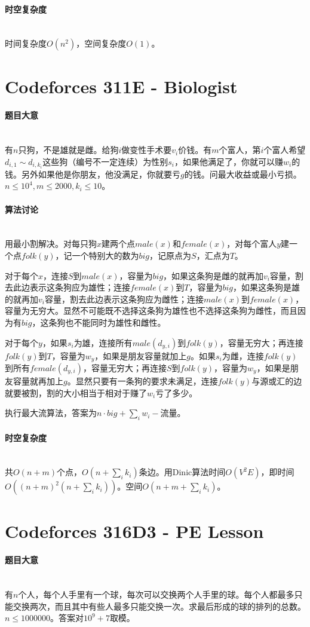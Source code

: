 \documentclass[UTF8]{ctexart}
\newcommand{\myparagraph}[1]{\paragraph{#1}\mbox{}\\}
\theoremstyle{nonumberplain}
\begin{document}
		\myparagraph{时空复杂度}
		
			时间复杂度$O(n^2)$，空间复杂度$O(1)$。
	
	\section{Codeforces 311E - Biologist}
	
		\myparagraph{题目大意}
		
			有$n$只狗，不是雄就是雌。给狗$i$做变性手术要$v_i$价钱。有$m$个富人，第$i$个富人希望$d_{i,1} \sim d_{i,k_i}$这些狗（编号不一定连续）为性别$s_i$，如果他满足了，你就可以赚$w_i$的钱。另外如果他是你朋友，他没满足，你就要亏$g$的钱。问最大收益或最小亏损。$n \leq 10^4, m \leq 2000, k_i \leq 10$。
		
		\myparagraph{算法讨论}
		
			用最小割解决。对每只狗$x$建两个点$male(x)$和$female(x)$，对每个富人$y$建一个点$folk(y)$，记一个特别大的数为$big$，记原点为$S$，汇点为$T$。
			
			对于每个$x$，连接$S$到$male(x)$，容量为$big$，如果这条狗是雌的就再加$v_i$容量，割去此边表示这条狗应为雄性；连接$female(x)$到$T$，容量为$big$，如果这条狗是雄的就再加$v_i$容量，割去此边表示这条狗应为雌性；连接$male(x)$到$female(x)$，容量为无穷大。显然不可能既不选择这条狗为雄性也不选择这条狗为雌性，而且因为有$big$，这条狗也不能同时为雄性和雌性。
			
			对于每个$y$，如果$s_i$为雄，连接所有$male(d_{y,i})$到$folk(y)$，容量无穷大；再连接$folk(y)$到$T$，容量为$w_y$，如果是朋友容量就加上$g$。如果$s_i$为雌，连接$folk(y)$到所有$female(d_{y,i})$，容量无穷大；再连接$S$到$folk(y)$，容量为$w_y$，如果是朋友容量就再加上$g$。显然只要有一条狗的要求未满足，连接$folk(y)$与源或汇的边就要被割，割的大小相当于相对于赚了$w_i$亏了多少。
			
			执行最大流算法，答案为$n \cdot big + \sum_i w_i - \mbox{流量}$。
		
		\myparagraph{时空复杂度}
		
			共$O(n+m)$个点，$O(n+\sum_i k_i)$条边。用Dinic算法时间$O(V^2E)$，即时间$O((n+m)^2(n+\sum_i k_i))$。空间$O(n+m+\sum_i k_i)$。
	
	\section{Codeforces 316D3 - PE Lesson}
	
		\myparagraph{题目大意}
		
			有$n$个人，每个人手里有一个球，每次可以交换两个人手里的球。每个人都最多只能交换两次，而且其中有些人最多只能交换一次。求最后形成的球的排列的总数。$n \leq 1000000$。答案对$10^9+7$取模。
		
\end{document}
